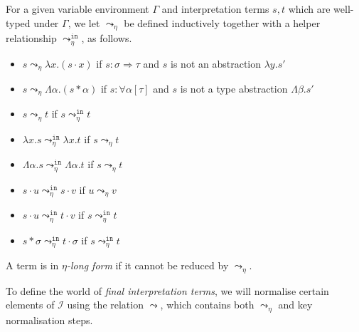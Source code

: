 \documentclass[runningheads,a4paper]{llncs}
\newcommand{\Iterms}{\mathcal{I}}
\newcommand{\quant}[2]{\forall #1[#2]}
\newcommand{\arrtype}{\Rightarrow}
\newcommand{\arreta}{\leadsto_\eta}
\newcommand{\arretain}{\leadsto_\eta^{\mathtt{in}}}
\newcommand{\arrnormalise}{\leadsto}
\newcommand{\abs}[2]{\lambda #1.#2}
\newcommand{\tabs}[2]{\Lambda #1.#2}
\newcommand{\app}[2]{#1 \cdot #2}
\newcommand{\tapp}[2]{#1 * #2}
\begin{document}
\begin{definition}
For a given variable environment $\Gamma$ and interpretation terms $s,
t$ which are well-typed under $\Gamma$, we let $\arreta$ be defined
inductively together with a helper relationship $\arretain$, as follows.
\begin{itemize}
\item $s \arreta \abs{x}{(\app{s}{x})}$ if $s : \sigma \arrtype \tau$
  and $s$ is not an abstraction $\abs{y}{s'}$
\item $s \arreta \tabs{\alpha}{(\tapp{s}{\alpha})}$ if $s : \quant{
  \alpha}{\tau}$ and $s$ is not a type abstraction $\tabs{\beta}{s'}$
\item $s \arreta t$ if $s \arretain t$
\item $\abs{x}{s} \arretain \abs{x}{t}$ if $s \arreta t$
\item $\tabs{\alpha}{s} \arretain \tabs{\alpha}{t}$ if $s \arreta t$
\item $\app{s}{u} \arretain \app{s}{v}$ if $u \arreta v$
\item $\app{s}{u} \arretain \app{t}{v}$ if $s \arretain t$
\item $\tapp{s}{\sigma} \arretain \app{t}{\sigma}$ if $s \arretain t$
\end{itemize}
A term is in \emph{$\eta$-long form} if it cannot be reduced by
$\arreta$.
\end{definition}

To define the world of \emph{final interpretation terms}, we will
normalise certain elements of $\Iterms$ using the relation
$\arrnormalise$, which contains both $\arreta$ and key normalisation
steps.
\end{document}
